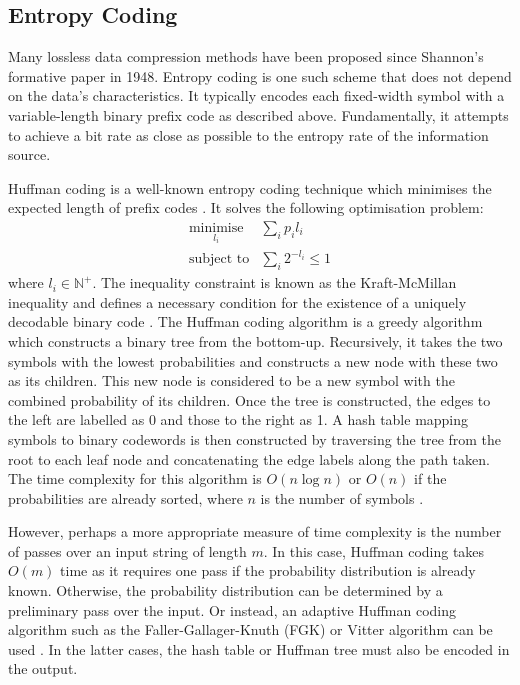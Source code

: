 \subsection{Entropy Coding}

Many lossless data compression methods have been proposed since Shannon's formative paper in 1948. Entropy coding is one such scheme that does not depend on the data's characteristics. It typically encodes each fixed-width symbol with a variable-length binary prefix code as described above. Fundamentally, it attempts to achieve a bit rate as close as possible to the entropy rate of the information source.

Huffman coding is a well-known entropy coding technique which minimises the expected length of prefix codes \cite{huffman}. It solves the following optimisation problem:
\begin{align*}
\underset{l_i}{\text{minimise}}&\sum_i p_il_i\\
\text{subject to}&\sum_i 2^{-l_i}\le 1
\end{align*}
where $l_i\in\mathbb{N}^+$. The inequality constraint is known as the Kraft-McMillan inequality and defines a necessary condition for the existence of a uniquely decodable binary code \cite{mcmillan}. The Huffman coding algorithm is a greedy algorithm which constructs a binary tree from the bottom-up. Recursively, it takes the two symbols with the lowest probabilities and constructs a new node with these two as its children. This new node is considered to be a new symbol with the combined probability of its children. Once the tree is constructed, the edges to the left are labelled as 0 and those to the right as 1. A hash table mapping symbols to binary codewords is then constructed by traversing the tree from the root to each leaf node and concatenating the edge labels along the path taken. The time complexity for this algorithm is $O(n\log n)$ or $O(n)$ if the probabilities are already sorted, where $n$ is the number of symbols \cite{huffman-time}.

However, perhaps a more appropriate measure of time complexity is the number of passes over an input string of length $m$. In this case, Huffman coding takes $O(m)$ time as it requires one pass if the probability distribution is already known. Otherwise, the probability distribution can be determined by a preliminary pass over the input. Or instead, an adaptive Huffman coding algorithm such as the Faller-Gallager-Knuth (FGK) or Vitter algorithm can be used \cite{fgk,vitter}. In the latter cases, the hash table or Huffman tree must also be encoded in the output.

